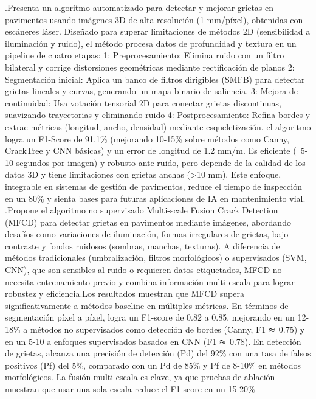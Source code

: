 \noindent \textcite{TC2018baoxian} .Presenta un algoritmo automatizado para detectar y mejorar grietas en pavimentos usando imágenes 3D de alta resolución (1 mm/píxel), obtenidas con escáneres láser. Diseñado para superar limitaciones de métodos 2D (sensibilidad a iluminación y ruido), el método procesa datos de profundidad y textura en un pipeline de cuatro etapas: 1: Preprocesamiento: Elimina ruido con un filtro bilateral y corrige distorsiones geométricas mediante rectificación de planos 2: Segmentación inicial: Aplica un banco de filtros dirigibles (SMFB) para detectar grietas lineales y curvas, generando un mapa binario de saliencia. 3: Mejora de continuidad: Usa votación tensorial 2D para conectar grietas discontinuas, suavizando trayectorias y eliminando ruido 4: Postprocesamiento: Refina bordes y extrae métricas (longitud, ancho, densidad) mediante esqueletización. el algoritmo logra un F1-Score de 91.1$\%$ (mejorando 10-15$\%$ sobre métodos como Canny, CrackTree y CNN básicas) y un error de longitud de 1.2 mm/m. Es eficiente (~5-10 segundos por imagen) y robusto ante ruido, pero depende de la calidad de los datos 3D y tiene limitaciones con grietas anchas (>10 mm). Este enfoque, integrable en sistemas de gestión de pavimentos, reduce el tiempo de inspección en un 80$\%$ y sienta bases para futuras aplicaciones de IA en mantenimiento vial.\\

\noindent \textcite{TC2018haifeng} .Propone el algoritmo no supervisado Multi-scale Fusion Crack Detection (MFCD) para detectar grietas en pavimentos mediante imágenes, abordando desafíos como variaciones de iluminación, formas irregulares de grietas, bajo contraste y fondos ruidosos (sombras, manchas, texturas). A diferencia de métodos tradicionales (umbralización, filtros morfológicos) o supervisados (SVM, CNN), que son sensibles al ruido o requieren datos etiquetados, MFCD no necesita entrenamiento previo y combina información multi-escala para lograr robustez y eficiencia.Los resultados muestran que MFCD supera significativamente a métodos baseline en múltiples métricas. En términos de segmentación píxel a píxel, logra un F1-score de 0.82 a 0.85, mejorando en un 12-18$\%$ a métodos no supervisados como detección de bordes (Canny, F1 $\thickapprox$ 0.75) y en un 5-10 a enfoques supervisados basados en CNN (F1 $\thickapprox$ 0.78). En detección de grietas, alcanza una precisión de detección (Pd) del 92$\%$ con una tasa de falsos positivos (Pf) del 5$\%$, comparado con un Pd de 85$\%$ y Pf de 8-10$\%$ en métodos morfológicos. La fusión multi-escala es clave, ya que pruebas de ablación muestran que usar una sola escala reduce el F1-score en un 15-20$\%$\\


